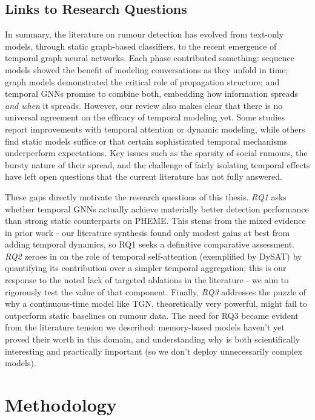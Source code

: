 \documentclass{cshonours}
\begin{document}
\section{Links to Research Questions}
In summary, the literature on rumour detection has evolved from text-only models, through static graph-based classifiers, to the recent emergence of temporal graph neural networks. Each phase contributed something: sequence models showed the benefit of modeling conversations as they unfold in time; graph models demonstrated the critical role of propagation structure; and temporal GNNs promise to combine both, embedding how information spreads \emph{and when} it spreads. However, our review also makes clear that there is no universal agreement on the efficacy of temporal modeling yet. Some studies report improvements with temporal attention or dynamic modeling, while others find static models suffice or that certain sophisticated temporal mechanisms underperform expectations. Key issues such as the sparsity of social rumours, the bursty nature of their spread, and the challenge of fairly isolating temporal effects have left open questions that the current literature has not fully answered.

These gaps directly motivate the research questions of this thesis. \emph{RQ1} asks whether temporal GNNs actually achieve materially better detection performance than strong static counterparts on PHEME. This stems from the mixed evidence in prior work - our literature synthesis found only modest gains at best from adding temporal dynamics, so RQ1 seeks a definitive comparative assessment. \emph{RQ2} zeroes in on the role of temporal self-attention (exemplified by DySAT) by quantifying its contribution over a simpler temporal aggregation; this is our response to the noted lack of targeted ablations in the literature - we aim to rigorously test the value of that component. Finally, \emph{RQ3} addresses the puzzle of why a continuous-time model like TGN, theoretically very powerful, might fail to outperform static baselines on rumour data. The need for RQ3 became evident from the literature tension we described: memory-based models haven't yet proved their worth in this domain, and understanding why is both scientifically interesting and practically important (so we don't deploy unnecessarily complex models). 

\chapter{Methodology}\label{chap:methodology}
\end{document}
